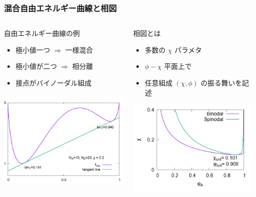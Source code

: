 \documentclass[unicode,12pt]{beamer}%
\begin{document}
\begin{frame}\frametitle{混合自由エネルギー曲線と相図}
    \begin{columns}[c, onlytextwidth]
            \begin{block}{自由エネルギー曲線の例}
                \begin{itemize}
					\item 極小値一つ $\Rightarrow$ 一様混合
					\item 極小値が二つ $\Rightarrow$ 相分離
					\item 接点がバイノーダル組成
				\end{itemize}
                \centering
					\includegraphics[width=.9\textwidth]{FE_tan_A10B20Chi0_2.png}
            \end{block}
        \begin{exampleblock}{相図とは}
            \begin{itemize}
                \item 多数の $\chi$ パラメタ
                \item $\phi-\chi$ 平面上で
                \item 任意組成 $(\chi, \phi)$ の振る舞いを記述
            \end{itemize}
            \centering
                \includegraphics[width=.9\textwidth]{PD_6_600.png}

\end{exampleblock}
\end{columns}
\end{frame}
\end{document}
